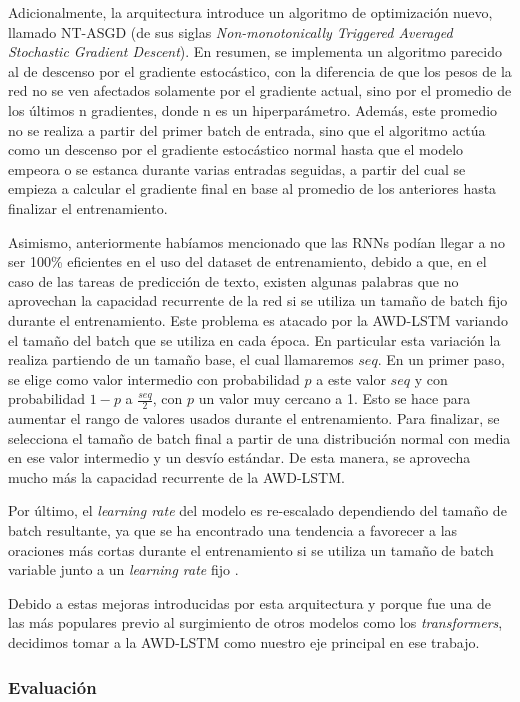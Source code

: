 Adicionalmente, la arquitectura introduce un algoritmo de optimización nuevo, llamado NT-ASGD (de sus siglas \textit{Non-monotonically Triggered Averaged Stochastic Gradient Descent}). En resumen, se implementa un algoritmo parecido al de descenso por el gradiente estocástico, con la diferencia de que los pesos de la red no se ven afectados solamente por el gradiente actual, sino por el promedio de los últimos n gradientes, donde n es un hiperparámetro. Además, este promedio no se realiza a partir del primer batch de entrada, sino que el algoritmo actúa como un descenso por el gradiente estocástico normal hasta que el modelo empeora o se estanca durante varias entradas seguidas, a partir del cual se empieza a calcular el gradiente final en base al promedio de los anteriores hasta finalizar el entrenamiento.

Asimismo, anteriormente habíamos mencionado que las RNNs podían llegar a no ser 100\% eficientes en el uso del dataset de entrenamiento, debido a que, en el caso de las tareas de predicción de texto, existen algunas palabras que no aprovechan la capacidad recurrente de la red si se utiliza un tamaño de batch fijo durante el entrenamiento. Este problema es atacado por la AWD-LSTM variando el tamaño del batch que se utiliza en cada época. En particular esta variación la realiza partiendo de un tamaño base, el cual llamaremos $seq$. En un primer paso, se elige como valor intermedio con probabilidad $p$ a este valor $seq$ y con probabilidad $1-p$ a $\frac{seq}{2}$, con $p$ un valor muy cercano a 1. Esto se hace para aumentar el rango de valores usados durante el entrenamiento. Para finalizar, se selecciona el tamaño de batch final a partir de una distribución normal con media en ese valor intermedio y un desvío estándar. De esta manera, se aprovecha mucho más la capacidad recurrente de la AWD-LSTM.

Por último, el \textit{learning rate} del modelo es re-escalado dependiendo del tamaño de batch resultante, ya que se ha encontrado una tendencia a favorecer a las oraciones más cortas durante el entrenamiento si se utiliza un tamaño de batch variable junto a un \textit{learning rate} fijo \parencite{merity2017regularizingoptimizinglstmlanguage}.

Debido a estas mejoras introducidas por esta arquitectura y porque fue una de las más populares previo al surgimiento de otros modelos como los \textit{transformers}, decidimos tomar a la AWD-LSTM como nuestro eje principal en ese trabajo.

\subsubsection{Evaluación}

